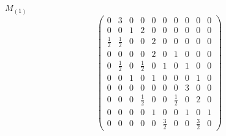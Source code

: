 \documentclass[12pt,reqno]{amsart}
\begin{document}
\Large
$M_{(1)}$                             $$ \begin{pmatrix} 
         0 & 3 & 0 & 0 & 0 & 0 & 0 & 0 & 0 & 0 \\[6pt]
         0 & 0 & 1 & 2 & 0 & 0 & 0 & 0 & 0 & 0 \\[6pt]
 \frac{1}{2} &  \frac{1}{2} & 0 & 0 & 2 & 0 & 0 & 0 & 0 & 0 

  \\[6pt]

         0 & 0 & 0 & 0 & 2 & 0 & 1 & 0 & 0 & 0 \\[6pt]
0 &  \frac{1}{2} & 0 &  \frac{1}{2} & 0 & 1 & 0 & 1 & 0 & 0 

  \\[6pt]

         0 & 0 & 1 & 0 & 1 & 0 & 0 & 0 & 1 & 0 \\[6pt]
         0 & 0 & 0 & 0 & 0 & 0 & 0 & 3 & 0 & 0 \\[6pt]
0 & 0 & 0 &  \frac{1}{2} & 0 & 0 &  \frac{1}{2} & 0 & 2 & 0 

  \\[6pt]

         0 & 0 & 0 & 0 & 1 & 0 & 0 & 1 & 0 & 1 \\[6pt]
0 & 0 & 0 & 0 & 0 &  \frac{3}{2} & 0 & 0 &  \frac{3}{2} & 0
                              \end{pmatrix} $$ 
\end{document}
